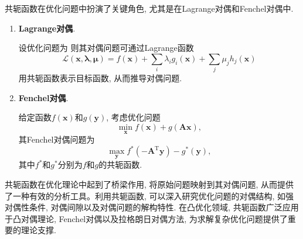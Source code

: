 共轭函数在优化问题中扮演了关键角色, 尤其是在Lagrange对偶和Fenchel对偶中.
\begin{enumerate}
    \item \textbf{Lagrange对偶}.

        设优化问题为
        则其对偶问题可通过Lagrange函数
        \begin{equation*}
            \mathcal{L}(\bm{x},\bm{\lambda},\bm{\mu})=f(\bm{x})+\sum_{i}\lambda_ig_i(\bm{x})+\sum_{j}\mu_jh_j(\bm{x})
        \end{equation*}
        用共轭函数表示目标函数, 从而推导对偶问题.
    
    \item \textbf{Fenchel对偶}.

        给定函数$f(\bm{x})$和$g(\bm{y})$, 考虑优化问题
        \begin{equation*}
            \min_{\bm{x}} f(\bm{x})+g(\bm{Ax}),
        \end{equation*}
        其Fenchel对偶问题为
        \begin{equation*}
            \max_{\bm{y}} f^*(-\bm{A}^\mathrm{T}\bm{y})-g^*(\bm{y}),
        \end{equation*}
        其中$f^*$和$g^*$分别为$f$和$g$的共轭函数.
\end{enumerate}

共轭函数在优化理论中起到了桥梁作用, 将原始问题映射到其对偶问题, 从而提供了一种有效的分析工具。利用共轭函数, 可以深入研究优化问题的对偶结构, 如强对偶性条件, 对偶间隙以及对偶问题的解构特性.
在凸优化领域, 共轭函数广泛应用于凸对偶理论, Fenchel对偶以及拉格朗日对偶方法, 为求解复杂优化问题提供了重要的理论支撑.
